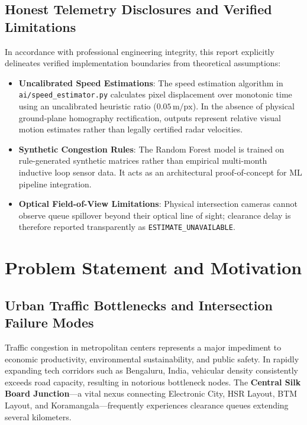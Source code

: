 \documentclass[11pt,a4paper,oneside]{report}
\begin{document}
\section{Honest Telemetry Disclosures and Verified Limitations}
In accordance with professional engineering integrity, this report explicitly delineates verified implementation boundaries from theoretical assumptions:
\begin{itemize}[leftmargin=*]
    \item \textbf{Uncalibrated Speed Estimations}: The speed estimation algorithm in \texttt{ai/speed\_estimator.py} calculates pixel displacement over monotonic time using an uncalibrated heuristic ratio ($0.05\,\text{m/px}$). In the absence of physical ground-plane homography rectification, outputs represent relative visual motion estimates rather than legally certified radar velocities.
    \item \textbf{Synthetic Congestion Rules}: The Random Forest model is trained on rule-generated synthetic matrices rather than empirical multi-month inductive loop sensor data. It acts as an architectural proof-of-concept for ML pipeline integration.
    \item \textbf{Optical Field-of-View Limitations}: Physical intersection cameras cannot observe queue spillover beyond their optical line of sight; clearance delay is therefore reported transparently as \texttt{ESTIMATE\_UNAVAILABLE}.
\end{itemize}



\chapter{Problem Statement and Motivation}

\section{Urban Traffic Bottlenecks and Intersection Failure Modes}
Traffic congestion in metropolitan centers represents a major impediment to economic productivity, environmental sustainability, and public safety. In rapidly expanding tech corridors such as Bengaluru, India, vehicular density consistently exceeds road capacity, resulting in notorious bottleneck nodes. The \textbf{Central Silk Board Junction}---a vital nexus connecting Electronic City, HSR Layout, BTM Layout, and Koramangala---frequently experiences clearance queues extending several kilometers.
\end{document}
